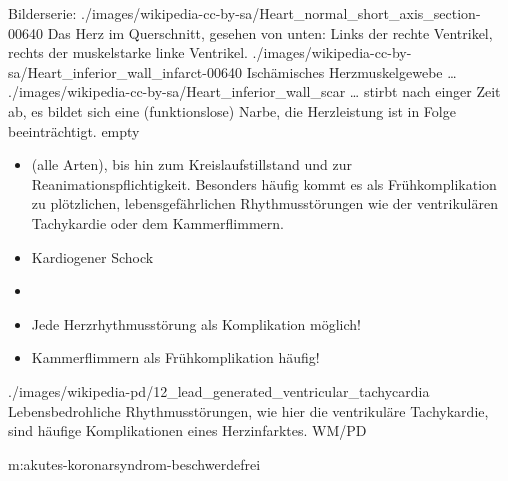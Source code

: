 \begin{PictureSeriesWide}{}{Bilderserie:
}
{./images/wikipedia-cc-by-sa/Heart_normal_short_axis_section-00640}
{Das Herz im Querschnitt, gesehen von unten: Links der
rechte Ventrikel, rechts der muskelstarke linke Ventrikel.
 }
{./images/wikipedia-cc-by-sa/Heart_inferior_wall_infarct-00640}
{Ischämisches Herzmuskelgewebe {\ldots}
} 
{./images/wikipedia-cc-by-sa/Heart_inferior_wall_scar}
{{\ldots} stirbt nach einger Zeit ab, es bildet sich eine
(funktionslose) Narbe, die Herzleistung ist in Folge beeinträchtigt. 
}
{empty}
{}
\end{PictureSeriesWide}

  
{%
\begin{itemize}
  \item {} (alle Arten), bis hin
  zum Kreislaufstillstand und zur Reanimationspflichtigkeit.
  Besonders häufig kommt es als Frühkomplikation zu plötzlichen, 
  lebensgefährlichen Rhythmusstörungen wie der ventrikulären 
  Tachykardie oder dem Kammerflimmern.
  \item Kardiogener Schock 
\end{itemize}
}{
\begin{itemize}
  \item {}
  \item Jede Herzrhythmusstörung als Komplikation möglich!
  \item Kammerflimmern als Frühkomplikation häufig!
\end{itemize}

}{}{}{}



{}
{}
{}
{./images/wikipedia-pd/12_lead_generated_ventricular_tachycardia}
{Lebensbedrohliche Rhythmusstörungen, wie hier die
ventrikuläre Tachykardie, sind häufige Komplikationen eines
Herzinfarktes.}
{WM/PD}




{m:akutes-koronarsyndrom-beschwerdefrei}{}{}


